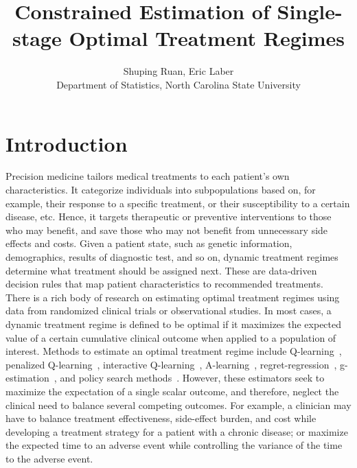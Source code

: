 \documentclass{article}
\title{Constrained Estimation of Single-stage Optimal Treatment Regimes}
\author{Shuping Ruan, Eric Laber\\ Department of Statistics, North Carolina State University}
\date{\vspace{-5ex}}
\begin{document}
\maketitle

\section{Introduction}
Precision medicine tailors medical treatments to each patient's own characteristics. It categorize individuals into subpopulations based on, for example, their response to a specific treatment, or their susceptibility to a certain disease, etc. Hence, it targets therapeutic or preventive interventions to those who may benefit, and save those who may not benefit from unnecessary side effects and costs. Given a patient state, such as genetic information, demographics, results of diagnostic test, and so on, dynamic treatment regimes determine what treatment should be assigned next. These are data-driven decision rules that map patient characteristics to recommended treatments. \\

There is a rich body of research on estimating optimal treatment regimes using data from randomized clinical trials or observational studies. In most cases, a dynamic treatment regime is defined to be optimal if it maximizes the expected value of a certain cumulative clinical outcome when applied to a population of interest. Methods to estimate an optimal treatment regime include Q-learning~\cite{Nahum2012}, penalized Q-learning~\cite{Song2011}, interactive Q-learning~\cite{Linn2014}, A-learning~\cite{Schulte2014}, regret-regression~\cite{henderson2010}, g-estimation~\cite{gestimation}, and policy search methods~\cite{Zhao2012,Zhao2015,Zhang2012,Zhang2012b,Orellana2010a,Zhao2012}. However, these estimators seek to maximize the expectation of a single scalar outcome, and therefore, neglect the clinical need to balance several competing outcomes. For example, a clinician may have to balance treatment effectiveness, side-effect burden, and cost while developing a treatment strategy for a patient with a chronic disease; or maximize the expected time to an adverse event while controlling the variance of the time to the adverse event.\\
\end{document}
